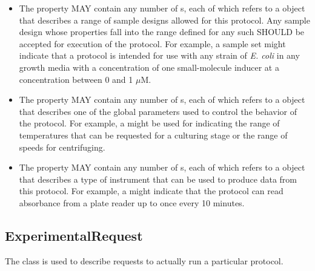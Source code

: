 
\begin{itemize}
\item \label{sec:allowedSample}
The  property MAY contain any number of s, each of which refers to a  object that describes a range of sample designs allowed for this protocol.
Any sample design whose properties fall into the range defined for any such  SHOULD be accepted for execution of the protocol.
For example, a sample set might indicate that a protocol is intended for use with any strain of {\it E. coli} in any growth media with a concentration of one small-molecule inducer at a concentration between 0 and 1 $\mu$M.

\item \label{sec:hasParameter}
The  property MAY contain any number of s, each of which refers to a  object that describes one of the global parameters used to control the behavior of the protocol. 
For example, a  might be used for indicating the range of temperatures that can be requested for a culturing stage or the range of speeds for centrifuging.

\item \label{sec:hasMeasurementType}
The  property MAY contain any number of s, each of which refers to a  object that describes a type of instrument that can be used to produce data from this protocol.
For example, a  might indicate that the protocol can read absorbance from a plate reader up to once every 10 minutes.
\end{itemize}

\subsection{ExperimentalRequest}
\label{sec:ExperimentalRequest}

The  class is used to describe requests to actually run a particular protocol.

